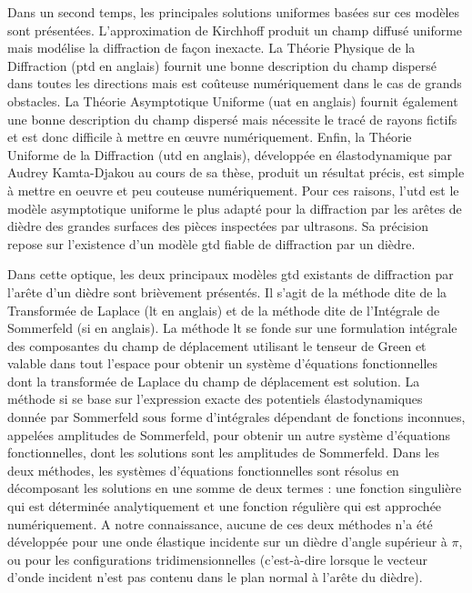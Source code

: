Dans un second temps, les principales solutions uniformes basées sur ces modèles sont présentées. L'approximation de Kirchhoff produit un champ diffusé uniforme mais modélise la diffraction de façon inexacte. La Théorie Physique de la Diffraction (\acrshort{ptd} en anglais) fournit une bonne description du champ dispersé dans toutes les directions mais est coûteuse numériquement dans le cas de grands obstacles. La Théorie Asymptotique Uniforme (\acrshort{uat} en anglais) fournit également une bonne description du champ dispersé mais nécessite le tracé de rayons fictifs et est donc difficile à mettre en œuvre numériquement. Enfin, la Théorie Uniforme de la Diffraction (\acrshort{utd} en anglais), développée en élastodynamique par Audrey Kamta-Djakou \cite{AKDthese} au cours de sa thèse, produit un résultat précis, est simple à mettre en oeuvre et peu couteuse numériquement. Pour ces raisons, l'\acrshort{utd} est le modèle asymptotique uniforme le plus adapté pour la diffraction par les arêtes de dièdre des grandes surfaces des pièces inspectées par ultrasons. Sa précision repose sur l'existence d'un modèle \acrshort{gtd} fiable de diffraction par un dièdre. 

Dans cette optique, les deux principaux modèles \acrshort{gtd} existants de diffraction par l'arête d'un dièdre sont brièvement présentés. Il s'agit de la méthode dite de la Transformée de Laplace (\acrshort{lt} en anglais) et de la méthode dite de l'Intégrale de Sommerfeld (\acrshort{si} en anglais). La méthode \acrshort{lt} se fonde sur une formulation intégrale des composantes du champ de déplacement utilisant le tenseur de Green et valable dans tout l'espace pour obtenir un système d'équations fonctionnelles dont la transformée de Laplace du champ de déplacement est solution. La méthode \acrshort{si} se base sur l'expression exacte des potentiels élastodynamiques donnée par Sommerfeld sous forme d'intégrales dépendant de fonctions inconnues, appelées amplitudes de Sommerfeld, pour obtenir un autre système d'équations fonctionnelles, dont les solutions sont les amplitudes de Sommerfeld. Dans les deux méthodes, les systèmes d'équations fonctionnelles sont résolus en décomposant les solutions en une somme de deux termes : une fonction singulière qui est déterminée analytiquement et une fonction régulière qui est approchée numériquement. A notre connaissance, aucune de ces deux méthodes n'a été développée pour une onde élastique incidente sur un dièdre d'angle supérieur à $\pi$, ou pour les configurations tridimensionnelles (c'est-à-dire lorsque le vecteur d'onde incident n'est pas contenu dans le plan normal à l'arête du dièdre).


